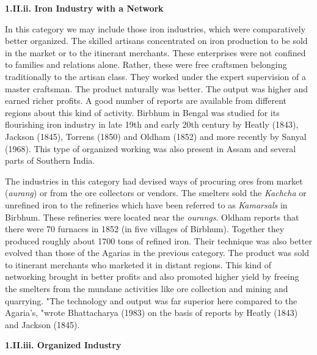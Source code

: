 \textbf{1.II.ii. Iron Industry with a Network}

In this category we may include those iron industries, which were comparatively better organized. The skilled artisans concentrated on iron production to be sold in the market or to the itinerant merchants. These enterprises were not confined to families and relations alone. Rather, these were free craftsmen belonging traditionally to the artisan class. They worked under the expert supervision of a master craftsman. The product naturally was better. The output was higher and earned richer profits. A good number of reports are available from different regions about this kind of activity. Birbhum in Bengal was studied for its flourishing iron industry in late 19th and early 20th century by Heatly (1843), Jackson (1845), Torrens (1850) and Oldham (1852) and more recently by Sanyal (1968). This type of organized working was also present in Assam and several parts of Southern India.

The industries in this category had devised ways of procuring ores from market (\textit{aurang}) or from the ore collectors or vendors. The smelters sold the \textit{Kachcha }or unrefined iron to the refineries which have been referred to as \textit{Kamarsals }in Birbhum. These refineries were located near the \textit{ourangs}. Oldham reports that there were 70 furnaces in 1852 (in five villages of Birbhum). Together they produced roughly about 1700 tons of refined iron. Their technique was also better evolved than those of the Agarias in the previous category. The product was sold to itinerant merchants who marketed it in distant regions. This kind of networking brought in better profits and also promoted higher yield by freeing the smelters from the mundane activities like ore collection and mining and quarrying. "The technology and output was far superior here compared to the Agaria's, "wrote Bhattacharya (1983) on the basis of reports by Heatly (1843) and Jackson (1845).

\textbf{1.II.iii. Organized Industry}

